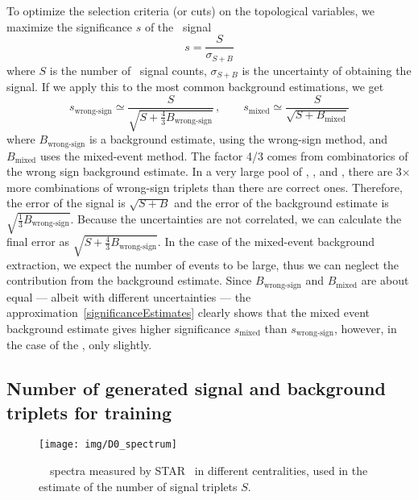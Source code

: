 To optimize the selection criteria (or cuts) on the topological variables, we maximize the significance $s$ of the \Lambdac\ signal
\begin{equation} \label{significance}
 s = \frac{S}{\sigma_{S+B}}
\end{equation}
where $S$ is the number of \Lambdac\ signal counts, $\sigma_{S+B}$ is the uncertainty of obtaining the signal.
If we apply this to the most common background estimations, we get
\begin{equation} \label{significanceEstimates}
  s_\text{wrong-sign} \simeq \frac{S}{\sqrt{S+\frac{4}{3}B_\text{wrong-sign}}}\,, \qquad
 s_\text{mixed} \simeq \frac{S}{\sqrt{S + B_\text{mixed}}} 
\end{equation}
where $B_\text{wrong-sign}$ is a background estimate, using the wrong-sign method, and $B_\text{mixed}$ uses the mixed-event method. The factor 4/3 comes from combinatorics of the wrong sign background estimate. In a very large pool of \pipm, \Kmp, and \ppm, there are 3$\times$ more combinations of wrong-sign triplets than there are correct ones. Therefore, the error of the signal is $\sqrt{S + B}$ and the error of the background estimate is $\sqrt{\frac{1}{3}B_\text{wrong-sign}}$\@. Because the uncertainties are not correlated, we can calculate the final error as $\sqrt{S+\frac{4}{3}B_\text{wrong-sign}}$\@. In the case of the mixed-event background extraction, we expect the number of events to be large, thus we can neglect the contribution from the background estimate. Since $B_\text{wrong-sign}$ and $B_\text{mixed}$ are about equal --- albeit with different uncertainties --- the approximation~\eqref{significanceEstimates} clearly shows that the mixed event background estimate gives higher significance $s_\text{mixed}$ than $s_\text{wrong-sign}$, however, in the case of the \Lambdac, only slightly.

\subsection{Number of generated signal and background triplets for training}

\begin{figure}[!htb]
\centering
\texttt{[image: img/D0\_spectrum]}

\caption[\dzero\ \pt\ spectra measured by STAR.]{\label{fig:D0spectrum}\dzero\ \pt\ spectra measured by STAR~\cite{D0paper} in different centralities, used in the estimate of the number of signal triplets $S$\@.}

\end{figure}

